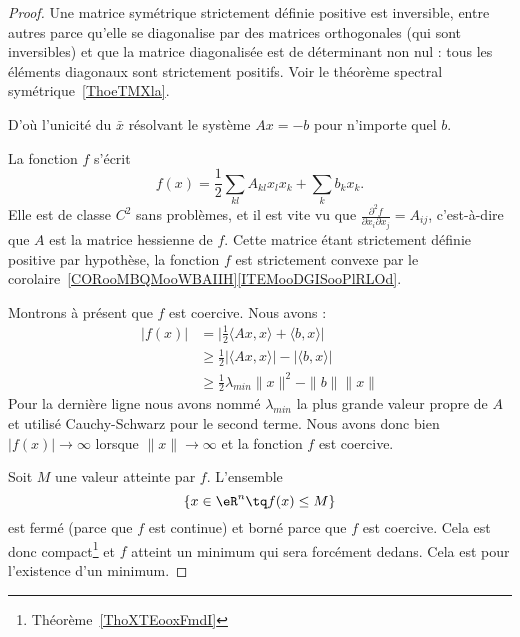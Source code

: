 \begin{proof}

	Une matrice symétrique strictement définie positive est inversible, entre autres parce qu'elle se diagonalise par des matrices orthogonales (qui sont inversibles) et que la matrice diagonalisée est de déterminant non nul : tous les éléments diagonaux sont strictement positifs. Voir le théorème spectral symétrique~\ref{ThoeTMXla}.

	D'où l'unicité du \( \bar x\) résolvant le système \( Ax=-b\) pour n'importe quel \( b\).

	\begin{subproof}

		La fonction \( f\) s'écrit
		\begin{equation}
			f(x)=\frac{ 1 }{2}\sum_{kl}A_{kl}x_lx_k+\sum_kb_kx_k.
		\end{equation}
		Elle est de classe \( C^2\) sans problèmes, et il est vite vu que \( \frac{ \partial^2f }{ \partial x_i\partial x_j }=A_{ij}\), c'est-à-dire que \( A\) est la matrice hessienne de \( f\). Cette matrice étant strictement définie positive par hypothèse, la fonction \( f\) est strictement convexe par le corolaire~\ref{CORooMBQMooWBAIIH}\ref{ITEMooDGISooPlRLOd}.

		Montrons à présent que \( f\) est coercive. Nous avons :
		\begin{subequations}
			\begin{align}
				| f(x) | & =\big| \frac{ 1 }{2}\langle Ax, x\rangle +\langle b, x\rangle  \big| \\
				         & \geq\frac{ 1 }{2}| \langle Ax, x\rangle  |-| \langle b, x\rangle  |  \\
				         & \geq\frac{ 1 }{2}\lambda_{min}\| x \|^2-\| b \|\| x \|
			\end{align}
		\end{subequations}
		Pour la dernière ligne nous avons nommé \( \lambda_{min}\) la plus grande valeur propre de \( A\) et utilisé Cauchy-Schwarz pour le second terme. Nous avons donc bien \( | f(x) |\to \infty\) lorsque \( \| x \|\to\infty\) et la fonction \( f\) est coercive.
	\end{subproof}

	Soit \( M\) une valeur atteinte par \( f\). L'ensemble
	\begin{equation}
		\{ x\in \eR^n\tq f(x)\leq M \}
	\end{equation}
	est fermé (parce que \( f\) est continue) et borné parce que \( f\) est coercive. Cela est donc compact\footnote{Théorème~\ref{ThoXTEooxFmdI}} et \( f\) atteint un minimum qui sera forcément dedans. Cela est pour l'existence d'un minimum.


\end{proof}
